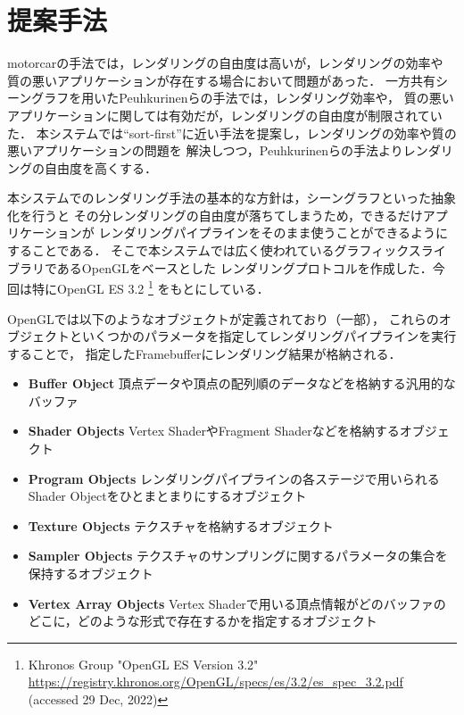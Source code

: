 \section{提案手法}

motorcarの手法では，レンダリングの自由度は高いが，レンダリングの効率や
質の悪いアプリケーションが存在する場合において問題があった．
一方共有シーングラフを用いたPeuhkurinenらの手法では，レンダリング効率や，
質の悪いアプリケーションに関しては有効だが，レンダリングの自由度が制限されていた．
本システムでは``sort-first''に近い手法を提案し，レンダリングの効率や質の悪いアプリケーションの問題を
解決しつつ，Peuhkurinenらの手法よりレンダリングの自由度を高くする．

本システムでのレンダリング手法の基本的な方針は，シーングラフといった抽象化を行うと
その分レンダリングの自由度が落ちてしまうため，できるだけアプリケーションが
レンダリングパイプラインをそのまま使うことができるようにすることである．
そこで本システムでは広く使われているグラフィックスライブラリであるOpenGLをベースとした
レンダリングプロトコルを作成した．今回は特にOpenGL ES 3.2
\footnote{Khronos Group "OpenGL ES Version 3.2" \url{https://registry.khronos.org/OpenGL/specs/es/3.2/es_spec_3.2.pdf} (accessed 29 Dec, 2022)}
をもとにしている．

OpenGLでは以下のようなオブジェクトが定義されており（一部），
これらのオブジェクトといくつかのパラメータを指定してレンダリングパイプラインを実行することで，
指定したFramebufferにレンダリング結果が格納される．
\begin{itemize}
  \item \textbf{Buffer Object} 頂点データや頂点の配列順のデータなどを格納する汎用的なバッファ
  \item \textbf{Shader Objects} Vertex ShaderやFragment Shaderなどを格納するオブジェクト
  \item \textbf{Program Objects} レンダリングパイプラインの各ステージで用いられるShader Objectをひとまとまりにするオブジェクト
  \item \textbf{Texture Objects} テクスチャを格納するオブジェクト
  \item \textbf{Sampler Objects} テクスチャのサンプリングに関するパラメータの集合を保持するオブジェクト
  \item \textbf{Vertex Array Objects}
        Vertex Shaderで用いる頂点情報がどのバッファのどこに，どのような形式で存在するかを指定するオブジェクト
\end{itemize}

